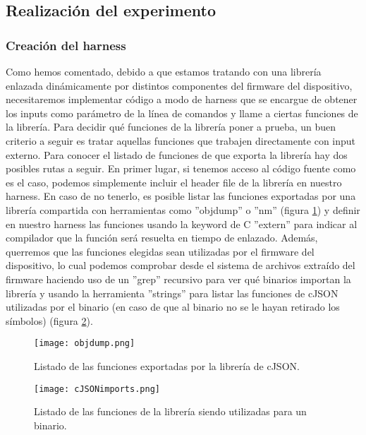 \subsection{Realización del experimento}
\subsubsection{Creación del harness}
Como hemos comentado, debido a que estamos tratando con una librería enlazada dinámicamente por distintos componentes del firmware del dispositivo, necesitaremos
implementar código a modo de harness que se encargue de obtener los inputs como parámetro de la línea de comandos y llame a ciertas funciones de la librería.
Para decidir qué funciones de la librería poner a prueba, un buen criterio a seguir es tratar aquellas funciones que trabajen directamente 
con input externo. Para conocer el listado de funciones de que exporta la librería hay dos posibles rutas a seguir. En primer lugar, si tenemos acceso al código
fuente como es el caso, podemos simplemente incluir el header file de la librería en nuestro harness. En caso de no tenerlo, es posible listar las funciones
exportadas por una librería compartida con herramientas como ''objdump'' o ''nm'' (figura \ref{fig:objdump}) y definir en nuestro harness las funciones usando 
la keyword de C ''extern'' para indicar al
compilador que la función será resuelta en tiempo de enlazado. Además, querremos que las funciones elegidas sean utilizadas por el firmware del dispositivo, lo
cual podemos comprobar desde el sistema de archivos extraído del firmware haciendo uso de un ''grep'' recursivo para ver qué binarios importan la librería y usando la herramienta ''strings'' para listar
las funciones de cJSON utilizadas por el binario (en caso de que al binario no se le hayan retirado los símbolos) (figura \ref{fig:cJSONimports}).

\begin{figure}[H]
    \centering
    \texttt{[image: objdump.png]}
    \caption{Listado de las funciones exportadas por la librería de cJSON.}
    \label{fig:objdump}
\end{figure}

\begin{figure}[H]
    \centering
    \texttt{[image: cJSONimports.png]}
    \caption{Listado de las funciones de la librería siendo utilizadas para un binario.}
    \label{fig:cJSONimports}
\end{figure}

